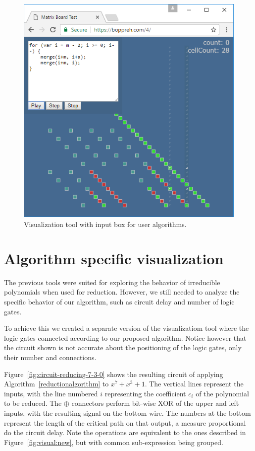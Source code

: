 \begin{figure}
  \caption{Visualization tool with input box for user algorithms.}
  \label{fig:source}
  \centering
  \includegraphics[width = .7\columnwidth]{figures/source.png}
\end{figure}


\section{Algorithm specific visualization}

The previous tools were suited for exploring the behavior of irreducible polynomials when used for reduction. However, we still needed to analyze the specific behavior of our algorithm, such as circuit delay and number of logic gates.

To achieve this we created a separate version of the visualizatiom tool where the logic gates connected according to our proposed algorithm. Notice however that the circuit shown is not accurate about the positioning of the logic gates, only their number and connections.

Figure~\ref{fig:circuit-reducing-7-3-0} shows the resulting circuit of applying Algorithm~\ref{reductionalgorithm} to $x^7 + x^3 + 1$. The vertical lines represent the inputs, with the line numbered $i$ representing the coefficient $c_i$ of the polynomial to be reduced. The $\oplus$  connectors perform bit-wise XOR of the upper and left inputs, with the resulting signal on the bottom wire. The numbers at the bottom represent the length of the critical path on that output, a measure proportional do the circuit delay. Note the operations are equivalent to the ones described in Figure~\ref{fig:visual:new}, but with common sub-expression being grouped.

